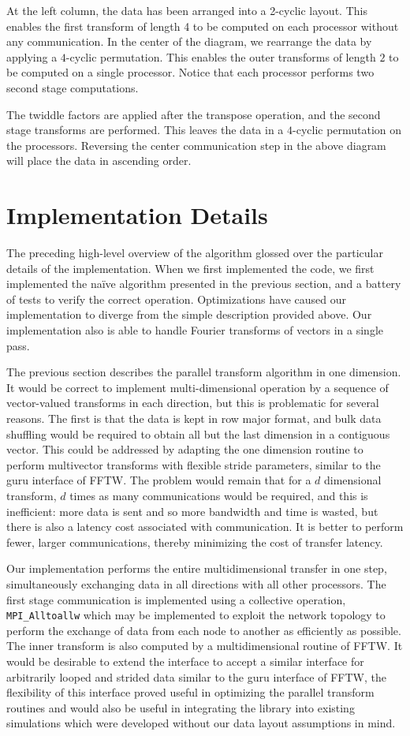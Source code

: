 \documentclass{article}
\theoremstyle{definition}
\begin{document}
At the left column, the data has been arranged into a 2-cyclic layout. This
enables the first transform of length 4 to be computed on each processor without
any communication. In the center of the diagram, we rearrange the data by
applying a $4$-cyclic permutation. This enables the outer transforms of length
$2$ to be computed on a single processor. Notice that each processor performs
two second stage computations.

The twiddle factors are applied after the transpose operation, and the second
stage transforms are performed. This leaves the data in a $4$-cyclic permutation
on the processors. Reversing the center communication step in the above diagram
will place the data in ascending order.

\section{Implementation Details}
The preceding high-level overview of the algorithm glossed over the particular
details of the implementation. When we first implemented the code, we first
implemented the naïve algorithm presented in the previous section, and a battery
of tests to verify the correct operation. Optimizations have caused our
implementation to diverge from the simple description provided above. Our
implementation also is able to handle Fourier transforms of vectors in a single
pass.

The previous section describes the parallel transform algorithm in one
dimension. It would be correct to implement multi-dimensional operation by a
sequence of vector-valued transforms in each direction, but this is problematic
for several reasons. The first is that the data is kept in row major format, and
bulk data shuffling would be required to obtain all but the last dimension in a
contiguous vector. This could be addressed by adapting the one dimension routine
to perform multivector transforms with flexible stride parameters, similar to
the guru interface of FFTW. The problem would remain that for a $d$ dimensional
transform, $d$ times as many communications would be required, and this is
inefficient: more data is sent and so more bandwidth and time is wasted, but
there is also a latency cost associated with communication. It is better to
perform fewer, larger communications, thereby minimizing the cost of transfer latency.

Our implementation performs the entire multidimensional transfer in one step,
simultaneously exchanging data in all directions with all other processors. The
first stage communication is implemented using a collective operation,
\texttt{MPI\_Alltoallw} which may be implemented to exploit the network topology
to perform the exchange of data from each node to another as efficiently as
possible. The inner transform is also computed by a multidimensional routine of
FFTW. It would be desirable to extend the interface to accept a similar
interface for arbitrarily looped and strided data similar to the guru interface
of FFTW, the flexibility of this interface proved useful in optimizing the
parallel transform routines and would also be useful in integrating the library
into existing simulations which were developed without our data layout
assumptions in mind.
\end{document}
